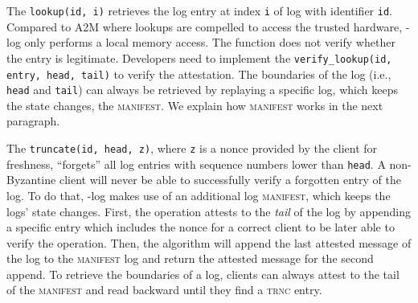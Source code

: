  The \texttt{lookup(id, i)} retrieves the log entry at index \texttt{i} of log with identifier \texttt{id}. Compared to A2M where lookups are compelled to access the trusted hardware, \projecttitle{}-log only performs a local memory access. 
The function does not verify whether the entry is legitimate. Developers need to implement the \texttt{verify\_lookup(id, entry, head, tail)} to verify the attestation. The boundaries of the log (i.e., \texttt{head} and \texttt{tail}) can always be retrieved by replaying a specific log, which keeps the state changes, the \textsc{manifest}. We explain how \textsc{manifest} works in the next paragraph.

 The \texttt{truncate(id, head, z)}, where \texttt{z} is a nonce provided by the client for freshness, ``forgets'' all log entries with sequence numbers lower than \texttt{head}. A non-Byzantine client will never be able to successfully verify a forgotten entry of the log. To do that, \projecttitle{}-log makes use of an additional log \textsc{manifest}, which keeps the logs' state changes. First, the operation attests to the {\em tail} of the log by appending a specific entry which includes the nonce for a correct client to be later able to verify the operation. Then, the algorithm will append the last attested message of the log to the \textsc{manifest} log and return the attested message for the second append. To retrieve the boundaries of a log, clients can always attest to the tail of the \textsc{manifest} and read backward until they find a \textsc{trnc} entry.


\noindent{}



